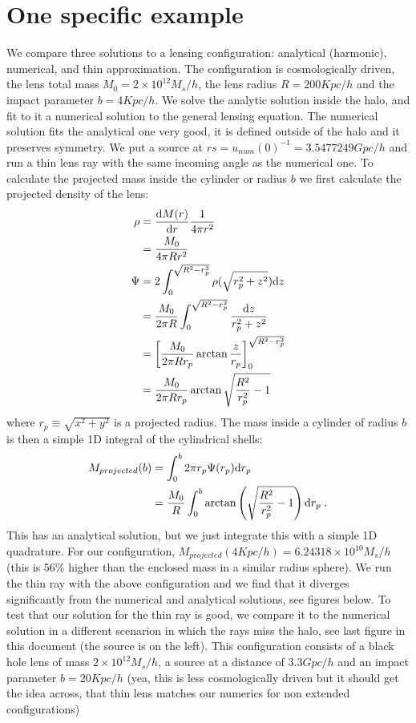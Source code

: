 \documentclass{article}
\begin{document}
\section{One specific example}
We compare three solutions to a lensing configuration: analytical (harmonic), numerical, and thin approximation. The configuration is cosmologically driven, the lens total mass $M_0=2\times 10^{12} M_s/h$, the lens radius $R=200 Kpc/h$ and the impact parameter $b=4 Kpc/h$. We solve the analytic solution inside the halo, and fit to it a numerical solution to the general lensing equation. The numerical solution fits the analytical one very good, it is defined outside of the halo and it preserves symmetry. We put a source at $rs = u_{num}(0)^{-1}=3.5477249 Gpc/h$ and run a thin lens ray with the same incoming angle as the numerical one. To calculate the projected mass inside the cylinder or radius $b$ we first calculate the projected density of the lens:
\begin{align}
    \rho &= \frac{   {\rm d}M(r)   }{   {\rm d}r   } \frac{1}{4\pi r^2}\\
    &= \frac{M_0}{4\pi Rr^2}\\
    \Psi&=2\int_0^{\sqrt{R^2-r_p^2}} \rho(\sqrt{r_p^2+z^2}) {\rm d}z \\
    &=\frac{M_0}{2\pi R} \int_0^{\sqrt{R^2-r_p^2}} \frac{{\rm d} z}{r_p^2+z^2} \\
    &=\left[ \frac{M_0}{2\pi R r_p} \arctan \frac{z}{r_p} \right] _0^{\sqrt{R^2-r_p^2}}\\
    &=\frac{M_0}{2\pi R r_p}\arctan \sqrt{\frac{R^2}{r_p^2}-1}
\end{align}
where $r_p\equiv \sqrt{x^2+y^2}$ is a projected radius. The mass inside a cylinder of radius $b$ is then a simple 1D integral of the cylindrical shells:
\begin{align}
    M_{projected}(b) &= \int_0^b 2\pi r_p \Psi(r_p) {\rm d} r_p \\
    &= \frac{M_0}{R} \int_0^b \arctan \left( \sqrt{\frac{R^2}{r_p^2}-1} \right) {\rm d} r_p\;.
\end{align}
This has an analytical solution, but we just integrate this with a simple 1D quadrature. For our configuration, $M_{projected}(4 Kpc/h) = 6.24318\times 10^{10} M_s/h$ (this is 56\% higher than the enclosed mass in a similar radius sphere). We run the thin ray with the above configuration and we find that it diverges significantly from the numerical and analytical solutions, see figures below. To test that our solution for the thin ray is good, we compare it to the numerical solution in a different scenarion in which the rays miss the halo, see last figure in this document (the source is on the left). This configuration consists of a black hole lens of mass $2\times 10^{12}M_s/h$, a source at a distance of $3.3 Gpc/h$ and an impact parameter $b=20 Kpc/h$ (yea, this is less cosmologically driven but it should get the idea across, that thin lens matches our numerics for non extended configurations) 
\end{document}
